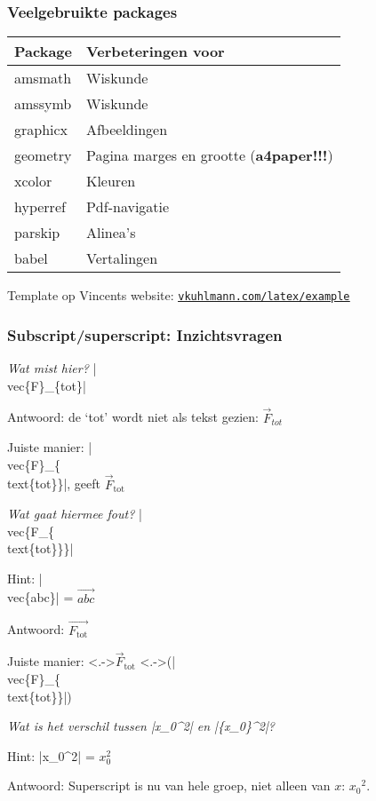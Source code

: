 \documentclass{cursuspresentatie}
\begin{document}
\begin{frame}
	\frametitle{Veelgebruikte packages}

	\begin{tabularx}{\textwidth}{X l}
		\toprule
		Package & Verbeteringen voor\\
		\midrule
		amsmath & Wiskunde \\
		amssymb & Wiskunde \\
		graphicx & Afbeeldingen \\
		geometry & Pagina marges en grootte (\textbf{a4paper!!!})\\
		xcolor & Kleuren \\
		hyperref & Pdf-navigatie \\
		parskip & Alinea's\\
		babel & Vertalingen\\
		\bottomrule
	\end{tabularx}
	\medskip

	Template op Vincents website: \href{https://vkuhlmann.com/latex/example}{\ul{\texttt{vkuhlmann.com/latex/example}}}
\end{frame}

\begin{frame}
	\frametitle{Subscript/superscript: Inzichtsvragen}

	\emph{Wat mist hier?} \hll|\\vec\{F\}_\{tot\}|
	
	\pause
	Antwoord: de `tot' wordt niet als tekst gezien: $ \vec{F}_{tot} $

	Juiste manier: \hll|\\vec\{F\}_\{\\text\{tot\}\}|, geeft $ \vec{F}_{\text{tot}} $

	\medskip

	\pause
	\emph{Wat gaat hiermee fout?} \hll|\\vec\{F_\{\\text\{tot\}\}\}|

	\pause Hint: \hll|\\vec\{abc\}| = $ \vec{abc} $

	\pause Antwoord: $ \vec{F_{\text{tot}}} $ \uncover<+->{(\hll|\\vec\{F_\{\\text\{tot\}\}\}|)}

	Juiste manier: \uncover<.->{$ \vec{F}_{\text{tot}} $} \uncover<.->{(\hll|\\vec\{F\}_\{\\text\{tot\}\}|)}

	\medskip

	\pause
	\emph{Wat is het verschil tussen \textnormal{\hll|x_0^2|} en \textnormal{\hll|\{x_0\}^2|}?}

	\pause Hint: \hll|x_0^2| = $ x_0^2 $

	\pause Antwoord: Superscript is nu van hele groep, niet alleen van $ x $: $ {x_0}^2 $.

\end{frame}
\end{document}
